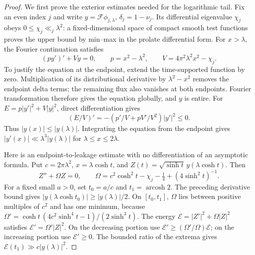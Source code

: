 \begin{proof}
We first prove the exterior estimates needed for the logarithmic tail.
Fix an even index $j$ and write $y=\mathcal F\phi_{j,\lambda}$,
$\delta_j=1-\nu_j$. Its differential eigenvalue $\chi_j$ obeys
$0\le\chi_j\ll_j\lambda^2$: a fixed-dimensional space of compact
smooth test functions proves the upper bound by min--max in the
prolate differential form. For $x>\lambda$, the Fourier continuation
satisfies
\[
 (py')'+Vy=0,\qquad
 p=x^2-\lambda^2,\qquad V=4\pi^2\lambda^2x^2-\chi_j.
\]
To justify the equation at the endpoint, extend the time-supported
function by zero. Multiplication of its distributional derivative by
$\lambda^2-x^2$ removes the endpoint delta terms; the remaining flux
also vanishes at both endpoints. Fourier transformation therefore gives
the equation globally, and $y$ is entire.
For $E=p|y'|^2+V|y|^2$, direct differentiation gives
\[
 (E/V)'=-\left(p'/V+pV'/V^2\right)|y'|^2\le0.
\]
Thus $|y(x)|\le|y(\lambda)|$. Integrating the equation from the
endpoint gives $|y'(x)|\ll\lambda^3|y(\lambda)|$ for
$\lambda\le x\le2\lambda$.

Here is an endpoint-to-leakage estimate with no differentiation of an
asymptotic formula. Put $c=2\pi\lambda^2$, $x=\lambda\cosh t$, and
$Z(t)=\sqrt{\sinh t}\,y(\lambda\cosh t)$. Then
\[
 Z''+\Omega Z=0,\qquad
 \Omega=c^2\cosh^2t-\chi_j-\tfrac14+(4\sinh^2t)^{-1}.
\]
For a fixed small $a>0$, set $t_0=a/c$ and $t_1=\operatorname{arcosh}2$.
The preceding derivative bound gives
$|y(\lambda\cosh t_0)|\ge|y(\lambda)|/2$.
On $[t_0,t_1]$, $\Omega$ lies between positive multiples of $c^2$ and
has one minimum, because
$\Omega'=\cosh t\,(4c^2\sinh^4t-1)/(2\sinh^3t)$.
The energy $\mathcal E=|Z'|^2+\Omega|Z|^2$ satisfies
$\mathcal E'=\Omega'|Z|^2$. On the decreasing portion use
$\mathcal E'\ge(\Omega'/\Omega)\mathcal E$; on the increasing
portion use $\mathcal E'\ge0$. The bounded ratio of the extrema gives
$\mathcal E(t_1)\gg c|y(\lambda)|^2$.


\end{proof}
